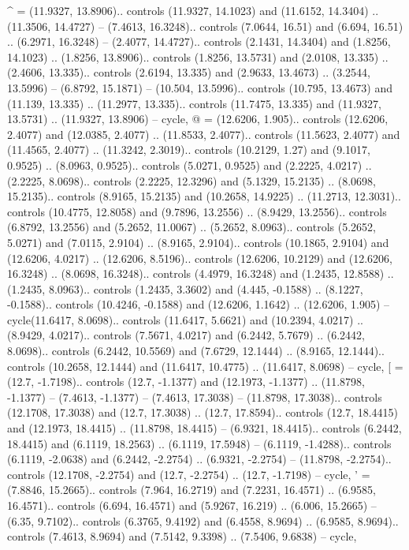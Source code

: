 {^} = {(11.9327, 13.8906).. controls (11.9327, 14.1023) and (11.6152, 14.3404) .. (11.3506, 14.4727) -- (7.4613, 16.3248).. controls (7.0644, 16.51) and (6.694, 16.51) .. (6.2971, 16.3248) -- (2.4077, 14.4727).. controls (2.1431, 14.3404) and (1.8256, 14.1023) .. (1.8256, 13.8906).. controls (1.8256, 13.5731) and (2.0108, 13.335) .. (2.4606, 13.335).. controls (2.6194, 13.335) and (2.9633, 13.4673) .. (3.2544, 13.5996) -- (6.8792, 15.1871) -- (10.504, 13.5996).. controls (10.795, 13.4673) and (11.139, 13.335) .. (11.2977, 13.335).. controls (11.7475, 13.335) and (11.9327, 13.5731) .. (11.9327, 13.8906) -- cycle},
{@} = {(12.6206, 1.905).. controls (12.6206, 2.4077) and (12.0385, 2.4077) .. (11.8533, 2.4077).. controls (11.5623, 2.4077) and (11.4565, 2.4077) .. (11.3242, 2.3019).. controls (10.2129, 1.27) and (9.1017, 0.9525) .. (8.0963, 0.9525).. controls (5.0271, 0.9525) and (2.2225, 4.0217) .. (2.2225, 8.0698).. controls (2.2225, 12.3296) and (5.1329, 15.2135) .. (8.0698, 15.2135).. controls (8.9165, 15.2135) and (10.2658, 14.9225) .. (11.2713, 12.3031).. controls (10.4775, 12.8058) and (9.7896, 13.2556) .. (8.9429, 13.2556).. controls (6.8792, 13.2556) and (5.2652, 11.0067) .. (5.2652, 8.0963).. controls (5.2652, 5.0271) and (7.0115, 2.9104) .. (8.9165, 2.9104).. controls (10.1865, 2.9104) and (12.6206, 4.0217) .. (12.6206, 8.5196).. controls (12.6206, 10.2129) and (12.6206, 16.3248) .. (8.0698, 16.3248).. controls (4.4979, 16.3248) and (1.2435, 12.8588) .. (1.2435, 8.0963).. controls (1.2435, 3.3602) and (4.445, -0.1588) .. (8.1227, -0.1588).. controls (10.4246, -0.1588) and (12.6206, 1.1642) .. (12.6206, 1.905) -- cycle(11.6417, 8.0698).. controls (11.6417, 5.6621) and (10.2394, 4.0217) .. (8.9429, 4.0217).. controls (7.5671, 4.0217) and (6.2442, 5.7679) .. (6.2442, 8.0698).. controls (6.2442, 10.5569) and (7.6729, 12.1444) .. (8.9165, 12.1444).. controls (10.2658, 12.1444) and (11.6417, 10.4775) .. (11.6417, 8.0698) -- cycle},
{[} = {(12.7, -1.7198).. controls (12.7, -1.1377) and (12.1973, -1.1377) .. (11.8798, -1.1377) -- (7.4613, -1.1377) -- (7.4613, 17.3038) -- (11.8798, 17.3038).. controls (12.1708, 17.3038) and (12.7, 17.3038) .. (12.7, 17.8594).. controls (12.7, 18.4415) and (12.1973, 18.4415) .. (11.8798, 18.4415) -- (6.9321, 18.4415).. controls (6.2442, 18.4415) and (6.1119, 18.2563) .. (6.1119, 17.5948) -- (6.1119, -1.4288).. controls (6.1119, -2.0638) and (6.2442, -2.2754) .. (6.9321, -2.2754) -- (11.8798, -2.2754).. controls (12.1708, -2.2754) and (12.7, -2.2754) .. (12.7, -1.7198) -- cycle},
{'} = {(7.8846, 15.2665).. controls (7.964, 16.2719) and (7.2231, 16.4571) .. (6.9585, 16.4571).. controls (6.694, 16.4571) and (5.9267, 16.219) .. (6.006, 15.2665) -- (6.35, 9.7102).. controls (6.3765, 9.4192) and (6.4558, 8.9694) .. (6.9585, 8.9694).. controls (7.4613, 8.9694) and (7.5142, 9.3398) .. (7.5406, 9.6838) -- cycle},
